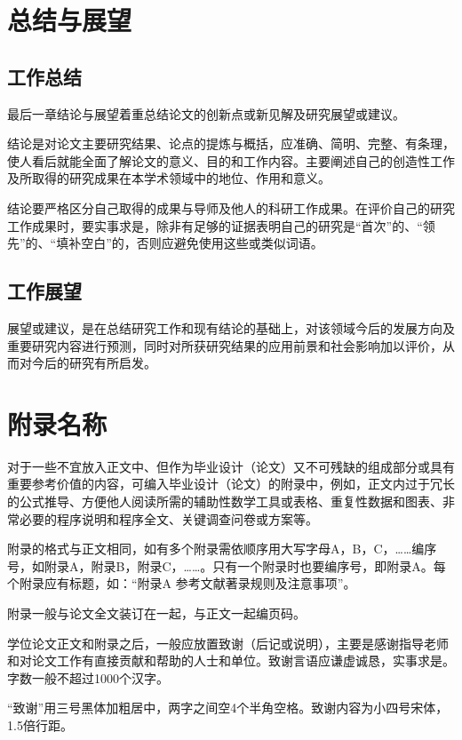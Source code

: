 \documentclass{seuthesis-2022}
\begin{document}
\chapter{总结与展望}
\section{工作总结}
最后一章结论与展望着重总结论文的创新点或新见解及研究展望或建议。

结论是对论文主要研究结果、论点的提炼与概括，应准确、简明、完整、有条理，使人看后就能全面了解论文的意义、目的和工作内容。主要阐述自己的创造性工作及所取得的研究成果在本学术领域中的地位、作用和意义。

结论要严格区分自己取得的成果与导师及他人的科研工作成果。在评价自己的研究工作成果时，要实事求是，除非有足够的证据表明自己的研究是“首次”的、“领先”的、“填补空白”的，否则应避免使用这些或类似词语。

\section{工作展望}
展望或建议，是在总结研究工作和现有结论的基础上，对该领域今后的发展方向及重要研究内容进行预测，同时对所获研究结果的应用前景和社会影响加以评价，从而对今后的研究有所启发。

\nocite{*}



\appendix
\chapter{附录名称}
对于一些不宜放入正文中、但作为毕业设计（论文）又不可残缺的组成部分或具有重要参考价值的内容，可编入毕业设计（论文）的附录中，例如，正文内过于冗长的公式推导、方便他人阅读所需的辅助性数学工具或表格、重复性数据和图表、非常必要的程序说明和程序全文、关键调查问卷或方案等。

附录的格式与正文相同，如有多个附录需依顺序用大写字母A，B，C，……编序号，如附录A，附录B，附录C，……。只有一个附录时也要编序号，即附录A。每个附录应有标题，如：“附录A 参考文献著录规则及注意事项”。

附录一般与论文全文装订在一起，与正文一起编页码。


\begin{acknowledgement}
学位论文正文和附录之后，一般应放置致谢（后记或说明），主要是感谢指导老师和对论文工作有直接贡献和帮助的人士和单位。致谢言语应谦虚诚恳，实事求是。字数一般不超过1000个汉字。

“致谢”用三号黑体加粗居中，两字之间空4个半角空格。致谢内容为小四号宋体，1.5倍行距。
\end{acknowledgement}
\end{document}
